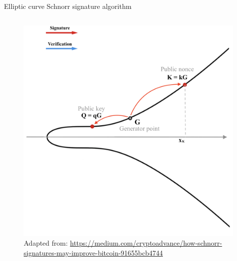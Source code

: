 \documentclass[slidescentered]{beamer}
\newcommand{\source}[1]{\caption*{\tiny Adapted from: {#1}} }
\begin{document}
\begin{frame}{Elliptic curve Schnorr signature algorithm}
\begin{columns}
\begin{column}{0.5\linewidth}
\begin{figure}
{						\source{\tiny \url{https://medium.com/cryptoadvance/how-schnorr-signatures-may-improve-bitcoin-91655bcb4744}}}
					 {\vspace*{-0.5cm}
						\hspace*{-1cm}
						\includegraphics[scale=0.29]{images/Schnorr1}
						\source{\tiny \url{https://medium.com/cryptoadvance/how-schnorr-signatures-may-improve-bitcoin-91655bcb4744}}}
				\end{figure}
			\end{column}
		\end{columns}
	\end{frame}
\end{document}
